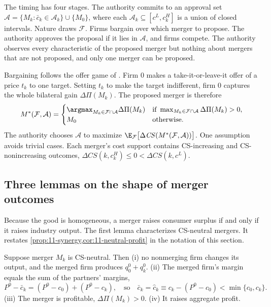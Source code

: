 The timing has four stages. The authority commits to an approval set $\mathcal{A} = \{M_k : \bar c_k \in
\mathcal{A}_k\} \cup \{M_0\}$, where each $\mathcal{A}_k \subseteq [c^L, c_k^H]$ is a union of closed intervals. Nature
draws $\mathcal{F}$. Firms bargain over which merger to propose. The authority approves the proposal if it lies in
$\mathcal{A}$, and firms compete. The authority observes every characteristic of the proposed merger but nothing about
mergers that are not proposed, and only one merger can be proposed.

Bargaining follows the offer game of \citet{Segal1999}. Firm 0 makes a take-it-or-leave-it offer of a price $t_k$ to one
target. Setting $t_k$ to make the target indifferent, firm 0 captures the whole bilateral gain $\Delta\Pi(M_k)$. The
proposed merger is therefore
\begin{equation}\label{eq:11-nw-proposal}
M^*(\mathcal{F}, \mathcal{A}) =
\begin{cases}
\argmax_{M_k \in \mathcal{F} \cap \mathcal{A}} \Delta\Pi(M_k) & \text{if } \max_{M_k \in \mathcal{F} \cap \mathcal{A}}
\Delta\Pi(M_k) > 0,\\
M_0 & \text{otherwise.}
\end{cases}
\end{equation}
The authority chooses $\mathcal{A}$ to maximize $\E_{\mathcal{F}}\big[\Delta\mathit{CS}(M^*(\mathcal{F}, \mathcal{A}))
\big]$. One assumption avoids trivial cases. Each merger's cost support contains CS-increasing and CS-nonincreasing
outcomes, $\Delta\mathit{CS}(k, c_k^H) \le 0 < \Delta\mathit{CS}(k, c^L)$.

\subsection{Three lemmas on the shape of merger outcomes}\label{sec:11-nw-lemmas}

Because the good is homogeneous, a merger raises consumer surplus if and only if it raises industry output. The first
lemma characterizes CS-neutral mergers. It restates \cref{prop:11-synergy,cor:11-neutral-profit} in the notation of
this section.

\begin{lemma}\label{lem:11-nw1}
Suppose merger $M_k$ is CS-neutral. Then (i) no nonmerging firm changes its output, and the merged firm produces
$q_0^0 + q_k^0$. (ii) The merged firm's margin equals the sum of the partners' margins,
\begin{equation}\label{eq:11-nw-neutral}
P^0 - \bar c_k = (P^0 - c_0) + (P^0 - c_k), \quad\text{so}\quad \bar c_k = \hat c_k \equiv c_k - (P^0 - c_0) <
\min\{c_0, c_k\}.
\end{equation}
(iii) The merger is profitable, $\Delta\Pi(M_k) > 0$. (iv) It raises aggregate profit.
\end{lemma}

